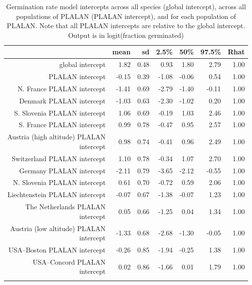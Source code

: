 \documentclass[12pt]{article}\usepackage[]{graphicx}\usepackage[]{color}
\begin{document}
\begin{longtable}{rrrrrrr}
\caption{Germination rate model intercepts across all species (global intercept), across all populations of PLALAN (PLALAN intercept), and for each population of PLALAN. Note that all PLALAN intercepts are relative to the global intercept.  Output is in logit(fraction germinated)} \\ 
  & mean & sd & 2.5\% & 50\% & 97.5\% & Rhat \\ 
  \hline
global intercept & 1.82 & 0.48 & 0.93 & 1.80 & 2.79 & 1.00 \\ 
  PLALAN intercept & -0.15 & 0.39 & -1.08 & -0.06 & 0.54 & 1.00 \\ 
  N. France PLALAN intercept & -1.41 & 0.69 & -2.79 & -1.40 & -0.11 & 1.00 \\ 
  Denmark PLALAN intercept & -1.03 & 0.63 & -2.30 & -1.02 & 0.20 & 1.00 \\ 
  S. Slovenia PLALAN intercept & 1.06 & 0.69 & -0.19 & 1.03 & 2.46 & 1.00 \\ 
  S. France PLALAN intercept & 0.99 & 0.78 & -0.47 & 0.95 & 2.57 & 1.00 \\ 
  Austria (high altitude) PLALAN intercept & 0.98 & 0.74 & -0.41 & 0.96 & 2.49 & 1.00 \\ 
  Switzerland PLALAN intercept & 1.10 & 0.78 & -0.34 & 1.07 & 2.70 & 1.00 \\ 
  Germany PLALAN intercept & -2.11 & 0.79 & -3.65 & -2.12 & -0.55 & 1.00 \\ 
  N. Slovenia PLALAN intercept & 0.61 & 0.70 & -0.72 & 0.59 & 2.06 & 1.00 \\ 
  Liechtenstein PLALAN intercept & -0.07 & 0.67 & -1.38 & -0.07 & 1.23 & 1.00 \\ 
  The Netherlands PLALAN intercept & 0.05 & 0.66 & -1.25 & 0.04 & 1.34 & 1.00 \\ 
  Austria (low altitude) PLALAN intercept & -1.33 & 0.68 & -2.68 & -1.30 & -0.05 & 1.00 \\ 
  USA--Boston PLALAN intercept & -0.26 & 0.85 & -1.94 & -0.25 & 1.38 & 1.00 \\ 
  USA--Concord PLALAN intercept & 0.02 & 0.86 & -1.66 & 0.01 & 1.79 & 1.00 \\ 
  \hline
\label{tab:mod_rate_intercept}
\end{longtable}
\end{document}

